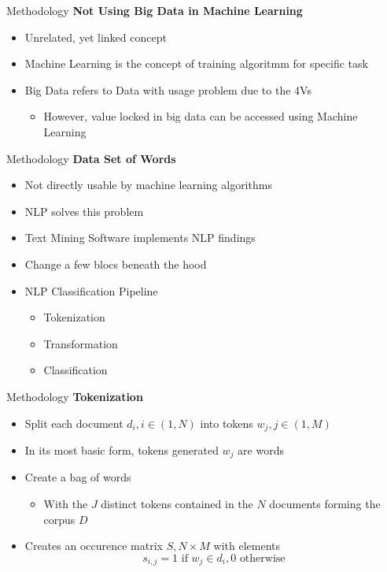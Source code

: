 \begin{frame}[label=metho]{Methodology}
	\textbf{Not Using Big Data in Machine Learning}
	\begin{itemize}
		\item Unrelated, yet linked concept
		\item Machine Learning is the concept of training algoritmm for specific task
		\item Big Data refers to Data with usage problem due to the 4Vs
		\begin{itemize}
			\item However, value locked in big data can be accessed using Machine Learning
		\end{itemize}	
	\end{itemize}
\end{frame}


\begin{frame}[label=metho]{Methodology}
	\textbf{Data Set of Words}
	\begin{itemize}
		\item Not directly usable by machine learning algorithms
		\item NLP solves this problem
		\item Text Mining Software implements NLP findings
		\item Change a few blocs beneath the hood
		\item NLP Classification Pipeline
		\begin{itemize}
			\item Tokenization
			\item Transformation
			\item Classification
		\end{itemize}	
	\end{itemize}
\end{frame}


\begin{frame}[label=metho]{Methodology}
	\textbf{Tokenization}
	\begin{itemize}
		\item Split each document $d_i, i \in(1, N)$ into tokens $w_j, j \in (1, M) $ 
		\item In its most basic form, tokens generated $w_j$ are words
		\item Create a bag of words
		\begin{itemize}
			\item With the $J$ distinct tokens contained in the $N$ documents forming the corpus $D$
		\end{itemize}
		\item Creates an occurence matrix $S, N \times M$ with elements
		$$ s_{i,j} = 1 \textrm{ if } w_j \in d_i, 0 \textrm{ otherwise}$$
	\end{itemize}
\end{frame}



